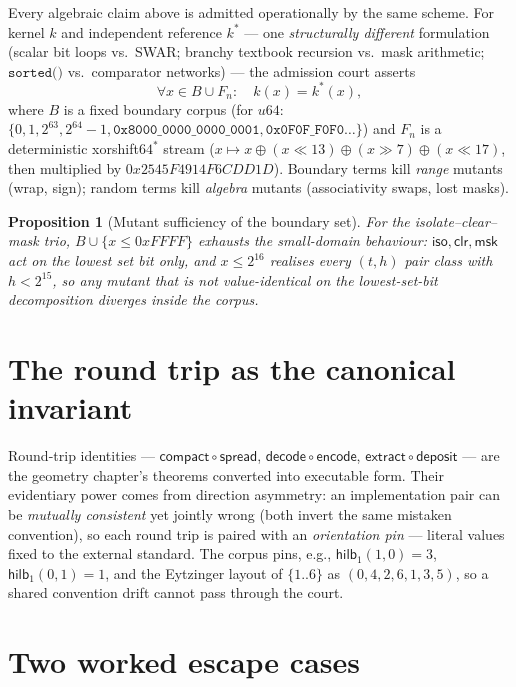 \documentclass[11pt,a4paper]{report}
\newtheorem{proposition}[theorem]{Proposition}
\begin{document}
Every algebraic claim above is admitted operationally by the same
scheme. For kernel $k$ and independent reference $k^{\ast}$ --- one
\emph{structurally different} formulation (scalar bit loops vs.\ SWAR;
branchy textbook recursion vs.\ mask arithmetic; $\texttt{sorted()}$
vs.\ comparator networks) --- the admission court asserts
\begin{equation}
\forall x \in B \cup F_n: \quad k(x) = k^{\ast}(x),
\end{equation}
where $B$ is a fixed boundary corpus (for $u64$: $\{0, 1, 2^{63},
2^{64}-1, \mathtt{0x8000\_0000\_0000\_0001}, \mathtt{0x0F0F\_F0F0\ldots}\}$)
and $F_n$ is a deterministic xorshift$64^{*}$ stream
($x \mapsto x \oplus (x \ll 13) \oplus (x \gg 7) \oplus (x \ll 17)$,
then multiplied by $0x2545F4914F6CDD1D$). Boundary terms kill
\emph{range} mutants (wrap, sign); random terms kill \emph{algebra}
mutants (associativity swaps, lost masks).

\begin{proposition}[Mutant sufficiency of the boundary set]
For the isolate--clear--mask trio, $B \cup \{x \le 0xFFFF\}$ exhausts
the small-domain behaviour: $\mathsf{iso}, \mathsf{clr},
\mathsf{msk}$ act on the lowest set bit only, and $x \le 2^{16}$
realises every $(t, h)$ pair class with $h < 2^{15}$, so any mutant
that is not value-identical on the lowest-set-bit decomposition
diverges inside the corpus.
\end{proposition}

\section{The round trip as the canonical invariant}

Round-trip identities --- $\mathsf{compact} \circ \mathsf{spread}$,
$\mathsf{decode} \circ \mathsf{encode}$,
$\mathsf{extract} \circ \mathsf{deposit}$ --- are the geometry
chapter's theorems converted into executable form. Their evidentiary
power comes from direction asymmetry: an implementation pair can be
\emph{mutually consistent} yet jointly wrong (both invert the same
mistaken convention), so each round trip is paired with an
\emph{orientation pin} --- literal values fixed to the external
standard. The corpus pins, e.g.,
$\mathsf{hilb}_1(1,0) = 3$, $\mathsf{hilb}_1(0,1) = 1$, and the
Eytzinger layout of $\{1..6\}$ as $(0,4,2,6,1,3,5)$, so a shared
convention drift cannot pass through the court.

\section{Two worked escape cases}
\end{document}
